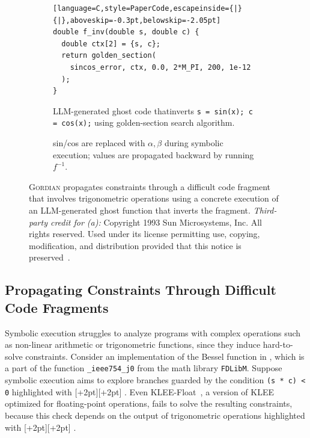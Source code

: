 \documentclass[acmsmall]{acmart}
\newcommand{\gordianhighlight}[2]{%
  \begingroup
  \setlength{\fboxsep}{0pt}%
  \colorbox{#1}{\kern1pt\raisebox{0pt}[\dimexpr\height+2pt\relax][\dimexpr\depth+2pt\relax]{#2}\kern1pt}%
  \endgroup
}
\newcommand{\hly}[1]{\gordianhighlight{yellow!50}{#1}}
\newcommand{\hlg}[1]{\gordianhighlight{green!50}{#1}}
\newcommand{\projName}{\textsc{Gordian}\xspace}
\theoremstyle{definition}
\begin{document}
\begin{figure}
\begin{subfigure}[b]{0.36\textwidth}
{\begin{lstlisting}[language=C,style=PaperCode,escapeinside={|}{|},aboveskip=-0.3pt,belowskip=-2.05pt]
double f_inv(double s, double c) {
  double ctx[2] = {s, c};
  return golden_section(
    sincos_error, ctx, 0.0, 2*M_PI, 200, 1e-12
  );
}
\end{lstlisting}
}
    \caption{LLM-generated ghost code that\linebreak inverts \texttt{s = sin(x); c = cos(x);} us\-ing golden-section search algorithm.}
    \label{fig:inversion}
  \end{subfigure}
  \hfill
  \begin{subfigure}[b]{0.35\textwidth}
    \centering 
    {%
      \def\svgwidth{1.4\textwidth}%
    }\vspace{2mm}
    \caption{sin/cos are replaced with $\alpha, \beta$ during symbolic execution; values are propagated backward by running $f^{-1}$.}
    \label{fig:propagation}
  \end{subfigure}
  \vspace{-2mm}
  \caption{\projName propagates constraints through a difficult code fragment that involves trigonometric operations using a concrete execution of an LLM-generated ghost function that inverts the fragment. \emph{Third-party credit for (a):} Copyright \textcopyright{} 1993 Sun Microsystems, Inc. All rights reserved. Used under its license permitting use, copying, modification, and distribution provided that this notice is preserved~\cite{fdlibm}.}
  \label{fig:complex_math_example}
  \vspace{-2mm}
\end{figure}

\subsection{Propagating Constraints Through Difficult Code Fragments}

Symbolic execution struggles to analyze programs with complex operations such as non-linear arithmetic or trigonometric functions, since they induce hard-to-solve constraints. Consider an implementation of the Bessel function in , which is a part of the function \texttt{\_ieee754\_j0} from the math library \texttt{FDLibM}. Suppose symbolic execution aims to explore branches guarded by the condition \lstinline[style=PaperCode]|(s * c) < 0| highlighted with \hlg{\phantom{X}}. Even KLEE-Float~\cite{kleeFloat}, a version of KLEE~\cite{klee} optimized for floating-point operations, fails to solve the resulting constraints, because this check depends on the output of trigonometric operations highlighted with \hly{\phantom{X}}.
\end{document}
